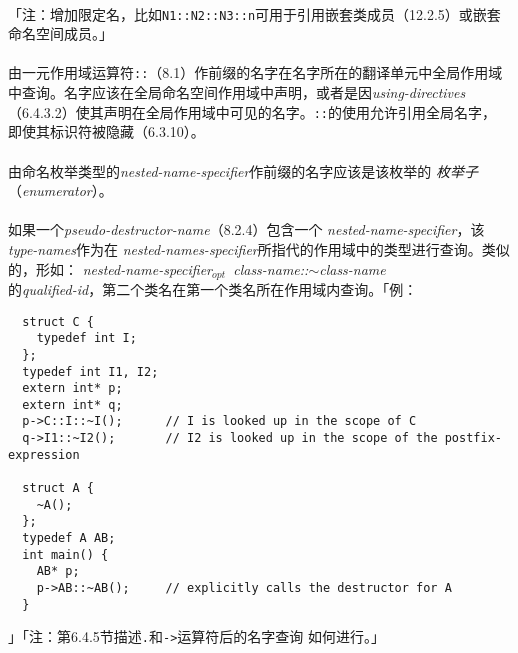 \paragraph{}
「注：增加限定名，比如\texttt{N1::N2::N3::n}可用于引用嵌套类成员（12.2.5）或嵌套
命名空间成员。」

\paragraph{}
由一元作用域运算符\texttt{::}（8.1）作前缀的名字在名字所在的翻译单元中全局作用域
中查询。名字应该在全局命名空间作用域中声明，或者是因\textit{using-directives}
（6.4.3.2）使其声明在全局作用域中可见的名字。\texttt{::}的使用允许引用全局名字，
即使其标识符被隐藏（6.3.10）。

\paragraph{}
由命名枚举类型的\textit{nested-name-specifier}作前缀的名字应该是该枚举的
\textit{枚举子}（\textit{enumerator}）。

\paragraph{}
如果一个\textit{pseudo-destructor-name}（8.2.4）包含一个
\textit{nested-name-specifier}，该\textit{type-names}作为在
\textit{nested-names-specifier}所指代的作用域中的类型进行查询。类似的，形如：
\mbox{\qquad\textit{nested-name-specifier$_{opt}$ class-name::$\sim$class-name}}
\\
的\textit{qualified-id}，第二个类名在第一个类名所在作用域内查询。「例：
\begin{lstlisting}
  struct C {
    typedef int I;
  };
  typedef int I1, I2;
  extern int* p;
  extern int* q;
  p->C::I::~I();      // I is looked up in the scope of C
  q->I1::~I2();       // I2 is looked up in the scope of the postfix-expression

  struct A {
    ~A();
  };
  typedef A AB;
  int main() {
    AB* p;
    p->AB::~AB();     // explicitly calls the destructor for A
  }
\end{lstlisting}」「注：第6.4.5节描述\texttt{.}和\texttt{->}运算符后的名字查询
如何进行。」

